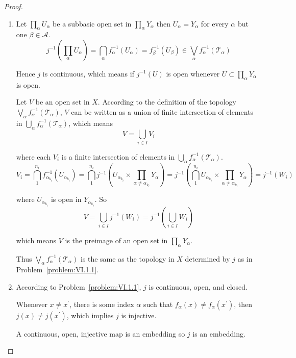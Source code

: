 \begin{proof}
	\begin{enumerate}[label={(\alph*)}]
		\item Let \( \prod_{\alpha} U_{\alpha} \) be a subbasic open set in \( \prod_{\alpha} Y_{\alpha} \) then \( U_{\alpha} = Y_{\alpha} \) for every \( \alpha \) but one \( \beta \in \mathscr{A} \).
		      \[
			      j^{-1}\left( \prod_{\alpha} U_{\alpha} \right) = \bigcap_{\alpha} f_{\alpha}^{-1}(U_{\alpha}) = f_{\beta}^{-1}(U_{\beta}) \in \bigvee_{\alpha} f_{\alpha}^{-1}(\mathscr{T}_{\alpha})
		      \]

		      Hence \( j \) is continuous, which means if \( j^{-1}(U) \) is open whenever \( U \subset \prod_{\alpha} Y_{\alpha} \) is open.

		      Let \( V \) be an open set in \( X \). According to the definition of the topology \( \bigvee_{\alpha} f_{\alpha}^{-1}(\mathscr{T}_{\alpha}) \), \( V \) can be written as a union of finite intersection of elements in \( \bigcup_{\alpha} f_{\alpha}^{-1}(\mathscr{T}_{\alpha}) \), which means
		      \[
			      V = \bigcup_{i\in I} V_{i}
		      \]

		      where each \( V_{i} \) is a finite intersection of elements in \( \bigcup_{\alpha} f_{\alpha}^{-1}(\mathscr{T}_{\alpha}) \).
		      \[
			      V_{i} = \bigcap^{n_{i}}_{1} f_{\alpha_{k_{i}}}^{-1}(U_{\alpha_{k_{i}}}) = \bigcap^{n_{i}}_{1} j^{-1}\left( U_{\alpha_{k_{i}}} \times \prod_{\alpha \ne \alpha_{k_{i}}} Y_{\alpha} \right) = j^{-1}\left( \bigcap^{n_{i}}_{1} U_{\alpha_{k_{i}}} \times \prod_{\alpha \ne \alpha_{k_{i}}} Y_{\alpha} \right) = j^{-1}(W_{i})
		      \]

		      where \( U_{\alpha_{k_{i}}} \) is open in \( Y_{\alpha_{k_{i}}} \). So
		      \[
			      V = \bigcup_{i\in I} j^{-1}(W_{i}) = j^{-1}\left( \bigcup_{i\in I} W_{i} \right)
		      \]

		      which means \( V \) is the preimage of an open set in \( \prod_{\alpha} Y_{\alpha} \).

		      Thus \( \bigvee_{\alpha} f_{\alpha}^{-1}(\mathscr{T}_{\alpha}) \) is the same as the topology in \( X \) determined by \( j \) as in Problem~\ref{problem:VI.1.1}.
		\item According to Problem~\ref{problem:VI.1.1}, \( j \) is continuous, open, and closed.

		      Whenever \( x \ne x^{\prime} \), there is some index \( \alpha \) such that \( f_{\alpha}(x) \ne f_{\alpha}(x^{\prime}) \), then \( j(x) \ne j(x^{\prime}) \), which implies \( j \) is injective.

		      A continuous, open, injective map is an embedding so \( j \) is an embedding.
	\end{enumerate}
\end{proof}

